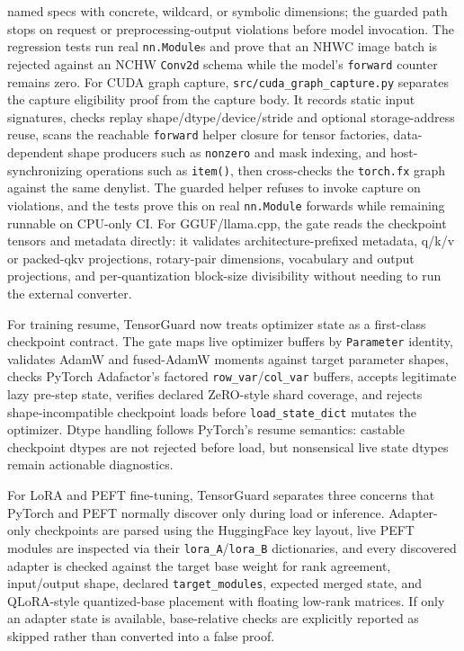 \documentclass[11pt]{article}
\newcommand{\tg}{TensorGuard}
\begin{document}
named specs with concrete, wildcard, or symbolic dimensions; the guarded path
stops on request or preprocessing-output violations before model invocation.
The regression tests run real \texttt{nn.Module}s and prove that an
NHWC image batch is rejected against an NCHW \texttt{Conv2d} schema while the
model's \texttt{forward} counter remains zero.
For CUDA graph capture, \texttt{src/cuda\_graph\_capture.py} separates the
capture eligibility proof from the capture body.  It records static input
signatures, checks replay shape/dtype/device/stride and optional storage-address
reuse, scans the reachable \texttt{forward} helper closure for tensor factories,
data-dependent shape producers such as \texttt{nonzero} and mask indexing, and
host-synchronizing operations such as \texttt{item()}, then cross-checks the
\texttt{torch.fx} graph against the same denylist.  The guarded helper refuses to
invoke capture on violations, and the tests prove this on real \texttt{nn.Module}
forwards while remaining runnable on CPU-only CI.
For GGUF/llama.cpp, the gate reads the checkpoint tensors and metadata directly:
it validates architecture-prefixed metadata, q/k/v or packed-qkv projections,
rotary-pair dimensions, vocabulary and output projections, and per-quantization
block-size divisibility without needing to run the external converter.

For training resume, \tg{} now treats optimizer state as a first-class checkpoint
contract.  The gate maps live optimizer buffers by \texttt{Parameter} identity,
validates AdamW and fused-AdamW moments against target parameter shapes, checks
PyTorch Adafactor's factored \texttt{row\_var}/\texttt{col\_var} buffers, accepts
legitimate lazy pre-step state, verifies declared ZeRO-style shard coverage, and
rejects shape-incompatible checkpoint loads before \texttt{load\_state\_dict}
mutates the optimizer.  Dtype handling follows PyTorch's resume semantics:
castable checkpoint dtypes are not rejected before load, but nonsensical live
state dtypes remain actionable diagnostics.

For LoRA and PEFT fine-tuning, \tg{} separates three concerns that PyTorch and
PEFT normally discover only during load or inference.  Adapter-only checkpoints
are parsed using the HuggingFace key layout, live PEFT modules are inspected via
their \texttt{lora\_A}/\texttt{lora\_B} dictionaries, and every discovered adapter
is checked against the target base weight for rank agreement, input/output
shape, declared \texttt{target\_modules}, expected merged state, and QLoRA-style
quantized-base placement with floating low-rank matrices.  If only an adapter
state is available, base-relative checks are explicitly reported as skipped
rather than converted into a false proof.
\end{document}
